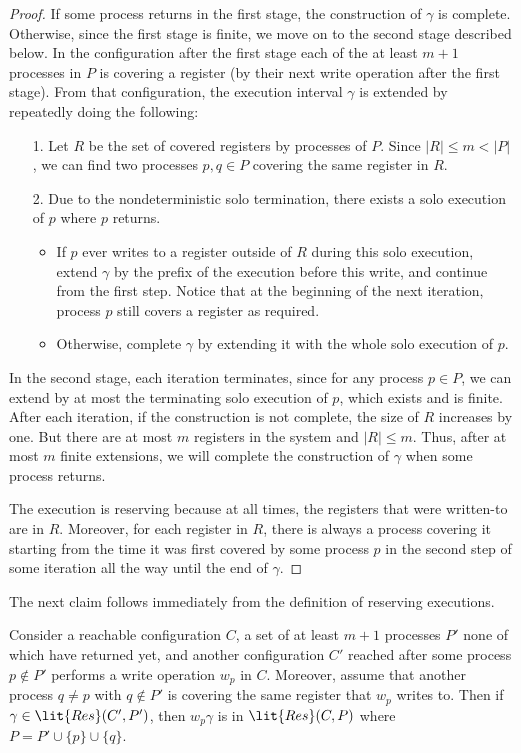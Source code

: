 \begin{proof}
If some process returns in the first stage, the construction of $\gamma$ is complete.
Otherwise, since the first stage is finite, we move on to the second stage described below.
In the configuration after the first stage each of the at least $m+1$ processes in $P$ is covering a register 
  (by their next write operation after the first stage).
From that configuration, the execution interval $\gamma$ is extended by repeatedly doing the following:
\begin{itemize}[noitemsep, nolistsep]
\item[1.] Let $R$ be the set of covered registers by processes of $P$.
  Since $|R| \leq m < |P|$, we can find two processes $p, q \in P$ covering the same register in $R$.
\item[2.] Due to the nondeterministic solo termination, there exists a solo execution of $p$ where $p$ returns.
  \begin{itemize}[noitemsep, nolistsep]
  \item If $p$ ever writes to a register outside of $R$ during this solo execution, 
    extend $\gamma$ by the prefix of the execution before this write, and continue from the first step.
    Notice that at the beginning of the next iteration, process $p$ still covers a register as required.
  \item Otherwise, complete $\gamma$ by extending it with the whole solo execution of $p$.
  \end{itemize}
\end{itemize}
In the second stage, each iteration terminates, since for any process $p \in P$, 
  we can extend by at most the terminating solo execution of $p$, which exists and is finite.
After each iteration, if the construction is not complete, the size of $R$ increases by one.
But there are at most $m$ registers in the system and $|R| \leq m$. 
Thus, after at most $m$ finite extensions, we will complete the construction of $\gamma$ when some process returns.

The execution is reserving because at all times, the registers that were written-to are in $R$.
Moreover, for each register in $R$, there is always a process covering it
  starting from the time it was first covered by some process $p$ in the second step of some iteration 
  all the way until the end of $\gamma$.
\end{proof}
\noindent The next claim follows immediately from the definition of reserving executions.
\begin{claim}
\label{clm:prefix}
Consider a reachable configuration $C$, a set of at least $m+1$ processes $P'$ none of which have returned yet, 
  and another configuration $C'$ reached after some process $p \not \in P'$ performs a write operation $w_p$ in $C$.  
Moreover, assume that another process $q \neq p$ with $q \not \in P'$ is covering the same register that $w_p$ writes to.
Then if $\gamma \in \lit{Res}(C', P')$, then $w_p \gamma$ is in $\lit{Res}(C, P)$ where $P = P' \cup \{p\} \cup \{q\}$. 
\end{claim}
